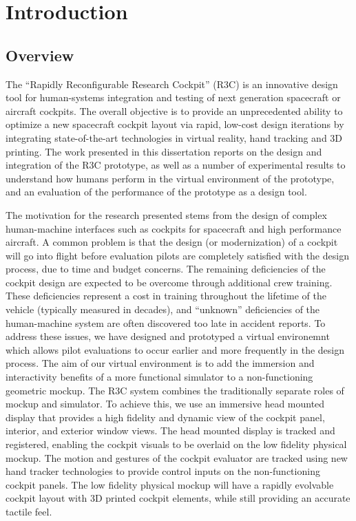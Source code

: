 \chapter{Introduction}

\section{Overview}
\label{overview}

The ``Rapidly Reconfigurable Research Cockpit'' (R3C) is an innovative design tool for human-systems integration and testing of next generation spacecraft or aircraft cockpits.
The overall objective is to provide an unprecedented ability to optimize a new spacecraft cockpit layout via rapid, low-cost design iterations by integrating state-of-the-art technologies in virtual reality, hand tracking and 3D printing.
The work presented in this dissertation reports on the design and integration of the R3C prototype, as well as a number of experimental results to understand how humans perform in the virtual environment of the prototype, and an evaluation of the performance of the prototype as a design tool.

The motivation for the research presented stems from the design of complex human-machine interfaces such as cockpits for spacecraft and high performance aircraft.
A common problem is that the design (or modernization) of a cockpit will go into flight before evaluation pilots are completely satisfied with the design process, due to time and budget concerns.
The remaining deficiencies of the cockpit design are expected to be overcome through additional crew training.
These deficiencies represent a cost in training throughout the lifetime of the vehicle (typically measured in decades), and ``unknown'' deficiencies of the human-machine system are often discovered too late in accident reports.
To address these issues, we have designed and prototyped a virtual environemnt which allows pilot evaluations to occur earlier and more frequently in the design process.
The aim of our virtual environment is to add the immersion and interactivity benefits of a more functional simulator to a non-functioning geometric mockup.
The R3C system combines the traditionally separate roles of mockup and simulator.
To achieve this, we use an immersive head mounted display that provides a high fidelity and dynamic view of the cockpit panel, interior, and exterior window views.
The head mounted display is tracked and registered, enabling the cockpit visuals to be overlaid on the low fidelity physical mockup.
The motion and gestures of the cockpit evaluator are tracked using new hand tracker technologies to provide control inputs on the non-functioning cockpit panels.
The low fidelity physical mockup will have a rapidly evolvable cockpit layout with 3D printed cockpit elements, while still providing an accurate tactile feel.

